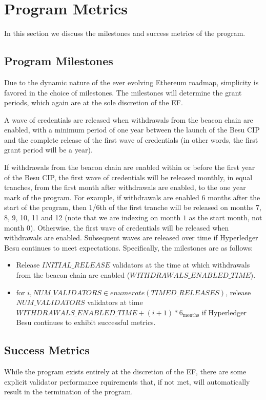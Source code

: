 
\section{Program Metrics} \label{sec:metrics}
In this section we discuss the milestones and success metrics of the program.

\subsection{Program Milestones}
Due to the dynamic nature of the ever evolving Ethereum roadmap, simplicity is favored in the choice of milestones.  The milestones will determine the grant periods, which again are at the sole discretion of the EF.

A wave of credentials are released when withdrawals from the beacon chain are enabled, with a minimum period of one year between the launch of the Besu CIP and the complete release of the first wave of credentials (in other words, the first grant period will be a year).

If withdrawals from the beacon chain are enabled within or before the first year of the Besu CIP, the first wave of credentials will be released monthly, in equal tranches, from the first month after withdrawals are enabled, to the one year mark of the program. For example, if withdrawals are enabled 6 months after the start of the program, then 1/6th of the first tranche will be released on months 7, 8, 9, 10, 11 and 12 (note that we are indexing on month $1$ as the start month, not month $0$). Otherwise, the first wave of credentials will be released when withdrawals are enabled. Subsequent waves are released over time if Hyperledger Besu continues to meet expectations. Specifically, the milestones are as follows:

\begin{itemize}
\item Release $INITIAL\_RELEASE$ validators at the time at which withdrawals from the beacon chain are enabled ($WITHDRAWALS\_ENABLED\_TIME$).
\item $\text{for } i, NUM\_VALIDATORS \in enumerate \left(TIMED\_RELEASES \right)$, release $NUM\_VALIDATORS$ validators at time $WITHDRAWALS\_ENABLED\_TIME + (i + 1) * 6_{\text{months}}$ if Hyperledger Besu continues to exhibit successful metrics.
\end{itemize}

\subsection{Success Metrics}
While the program exists entirely at the discretion of the EF, there are some explicit validator performance rquirements that, if not met, will automatically result in the termination of the program.

